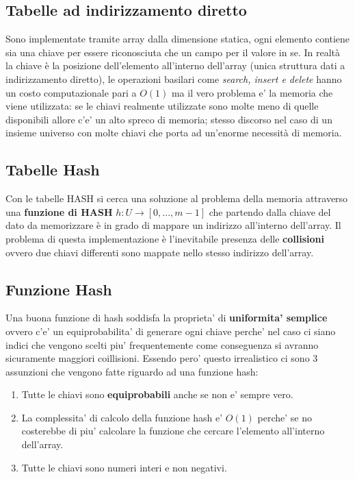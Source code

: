 \documentclass{article}
\begin{document}
\subsection{Tabelle ad indirizzamento diretto}
Sono implementate tramite array dalla dimensione statica, ogni elemento contiene sia una chiave per essere riconosciuta che un campo per il valore in se. 
In realtà la chiave è la posizione dell'elemento all'interno dell'array (unica struttura dati a indirizzamento diretto), le operazioni basilari come \textit{search, insert e delete} hanno un costo computazionale pari a $O(1)$ ma il vero problema e' la memoria che viene utilizzata: 
se le chiavi realmente utilizzate sono molte meno di quelle disponibili allore c'e' un alto spreco di memoria; stesso discorso nel caso di un insieme universo con molte chiavi che porta ad un'enorme necessità di memoria.
\subsection{Tabelle Hash}
Con le tabelle HASH si cerca una soluzione al problema della memoria attraverso una \textbf{funzione di HASH} $h:U \to [0, ..., m-1]$ 
che partendo dalla chiave del dato da memorizzare è in grado di mappare un indirizzo all'interno dell'array. 
Il problema di questa implementazione è l'inevitabile presenza delle \textbf{collisioni} ovvero due chiavi differenti sono mappate nello stesso indirizzo dell'array.

\subsection{Funzione Hash}
Una buona funzione di hash soddisfa la proprieta' di \textbf{uniformita' semplice} ovvero c'e' un equiprobabilita' di generare ogni chiave perche' nel caso ci siano indici che vengono scelti piu' frequentemente come conseguenza si avranno sicuramente maggiori coillisioni. Essendo pero' questo irrealistico ci sono 3 assunzioni che vengono fatte riguardo ad una funzione hash: \begin{enumerate}
    \item Tutte le chiavi sono \textbf{equiprobabili} anche se non e' sempre vero.
    \item La complessita' di calcolo della funzione hash e' $O(1)$ perche' se no costerebbe di piu' calcolare la funzione che cercare l'elemento all'interno dell'array.
    \item Tutte le chiavi sono numeri interi e non negativi.
\end{enumerate}
\end{document}
